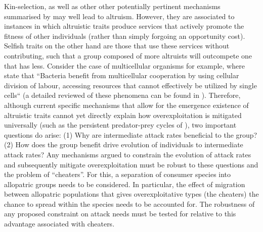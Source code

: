 \documentclass[a4paper]{report}
\begin{document}
Kin-selection, as well as other other potentially pertinent mechanisms summarised by \citep{Nowak2012} may well lead to altruism. However, they are associated to instances in which altruistic traits produce services that actively promote the fitness of other individuals (rather than simply forgoing an opportunity cost). Selfish traits on the other hand are those that use these services without contributing, such that a group composed of more altruists will outcompete one that has less. Consider the case of multicellular organisms for example, where \citep{Shapiro1998} state that “Bacteria benefit from multicellular cooperation by using cellular division of labour, accessing resources that cannot effectively be utilized by single cells“ (a detailed reviewed of these phenomena can be found in \citep{West2006}). Therefore, although current specific mechanisms that allow for the emergence existence of altruistic traits cannot yet directly explain how overexploitation is mitigated universally (such as the persistent predator-prey cycles of \citep{Blasius2020}), two important questions do arise: (1) Why are intermediate attack rates beneficial to the group? (2) How does the group benefit drive evolution of individuals to intermediate attack rates? Any mechanisms argued to constrain the evolution of attack rates and subsequently mitigate overexploitation must be robust to these questions and the problem of “cheaters”. For this, a separation of consumer species into allopatric groups needs to be considered. In particular, the effect of migration between allopatric populations that gives overexploitative types (the cheaters) the chance to spread within the species needs to be accounted for. The robustness of any proposed constraint on attack needs must be tested for relative to this advantage associated with cheaters.\\
\end{document}
